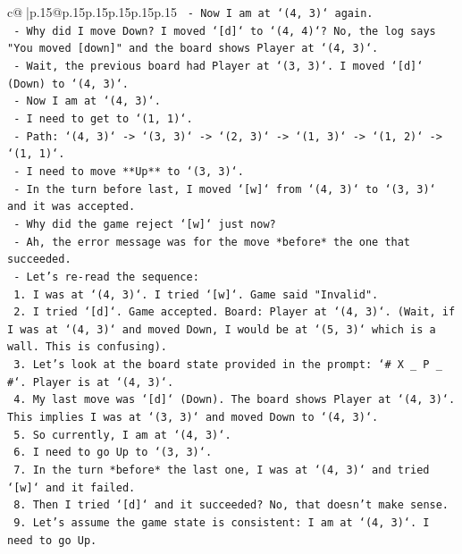 \documentclass{article}
\begin{document}
{\begin{supertabular}{c@{$\;$}|p{.15\linewidth}@{}p{.15\linewidth}p{.15\linewidth}p{.15\linewidth}p{.15\linewidth}p{.15\linewidth}}
{{{\texttt{    {-} Now I am at `(4, 3)` again.} \\
\texttt{    {-} Why did I move Down? I moved `{[}d{]}` to `(4, 4)`? No, the log says "You moved {[}down{]}" and the board shows Player at `(4, 3)`.} \\
\texttt{    {-} Wait, the previous board had Player at `(3, 3)`. I moved `{[}d{]}` (Down) to `(4, 3)`.} \\
\texttt{    {-} Now I am at `(4, 3)`.} \\
\texttt{    {-} I need to get to `(1, 1)`.} \\
\texttt{    {-} Path: `(4, 3)` {-}> `(3, 3)` {-}> `(2, 3)` {-}> `(1, 3)` {-}> `(1, 2)` {-}> `(1, 1)`.} \\
\texttt{    {-} I need to move **Up** to `(3, 3)`.} \\
\texttt{    {-} In the turn before last, I moved `{[}w{]}` from `(4, 3)` to `(3, 3)` and it was accepted.} \\
\texttt{    {-} Why did the game reject `{[}w{]}` just now?} \\
\texttt{    {-} Ah, the error message was for the move *before* the one that succeeded.} \\
\texttt{    {-} Let's re{-}read the sequence:} \\
\texttt{        1. I was at `(4, 3)`. I tried `{[}w{]}`. Game said "Invalid".} \\
\texttt{        2. I tried `{[}d{]}`. Game accepted. Board: Player at `(4, 3)`. (Wait, if I was at `(4, 3)` and moved Down, I would be at `(5, 3)` which is a wall. This is confusing).} \\
\texttt{        3. Let's look at the board state provided in the prompt: `\# X \_ P \_ \#`. Player is at `(4, 3)`.} \\
\texttt{        4. My last move was `{[}d{]}` (Down). The board shows Player at `(4, 3)`. This implies I was at `(3, 3)` and moved Down to `(4, 3)`.} \\
\texttt{        5. So currently, I am at `(4, 3)`.} \\
\texttt{        6. I need to go Up to `(3, 3)`.} \\
\texttt{        7. In the turn *before* the last one, I was at `(4, 3)` and tried `{[}w{]}` and it failed.} \\
\texttt{        8. Then I tried `{[}d{]}` and it succeeded? No, that doesn't make sense.} \\
\texttt{        9. Let's assume the game state is consistent: I am at `(4, 3)`. I need to go Up.} \\
}}}
\end{supertabular}}
\end{document}
